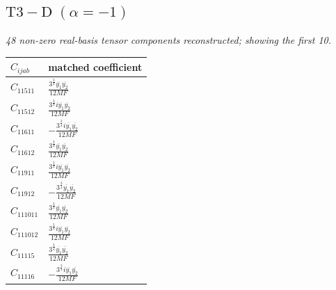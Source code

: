 \documentclass[9pt]{article}
\begin{document}
\subsection*{$ \mathrm{T3-D}\;(\alpha=-1) $}
\textit{48 non-zero real-basis tensor components reconstructed; showing the first 10.}
\begin{longtable}{@{}ll@{}}
\toprule
$C_{ijab}$ & matched coefficient \\
\midrule
$C_{11511}$ & $ \frac{3^{\frac{3}{4}} \overline{y_{1}} \overline{y_{2}}}{12 MF} $ \\
$C_{11512}$ & $ \frac{3^{\frac{3}{4}} i \overline{y_{1}} \overline{y_{2}}}{12 MF} $ \\
$C_{11611}$ & $ - \frac{3^{\frac{3}{4}} i \overline{y_{1}} \overline{y_{2}}}{12 MF} $ \\
$C_{11612}$ & $ \frac{3^{\frac{3}{4}} \overline{y_{1}} \overline{y_{2}}}{12 MF} $ \\
$C_{11911}$ & $ \frac{3^{\frac{3}{4}} i \overline{y_{1}} \overline{y_{2}}}{12 MF} $ \\
$C_{11912}$ & $ - \frac{3^{\frac{3}{4}} \overline{y_{1}} \overline{y_{2}}}{12 MF} $ \\
$C_{111011}$ & $ \frac{3^{\frac{3}{4}} \overline{y_{1}} \overline{y_{2}}}{12 MF} $ \\
$C_{111012}$ & $ \frac{3^{\frac{3}{4}} i \overline{y_{1}} \overline{y_{2}}}{12 MF} $ \\
$C_{11115}$ & $ \frac{3^{\frac{3}{4}} \overline{y_{1}} \overline{y_{2}}}{12 MF} $ \\
$C_{11116}$ & $ - \frac{3^{\frac{3}{4}} i \overline{y_{1}} \overline{y_{2}}}{12 MF} $ \\
\bottomrule
\end{longtable}
\end{document}

